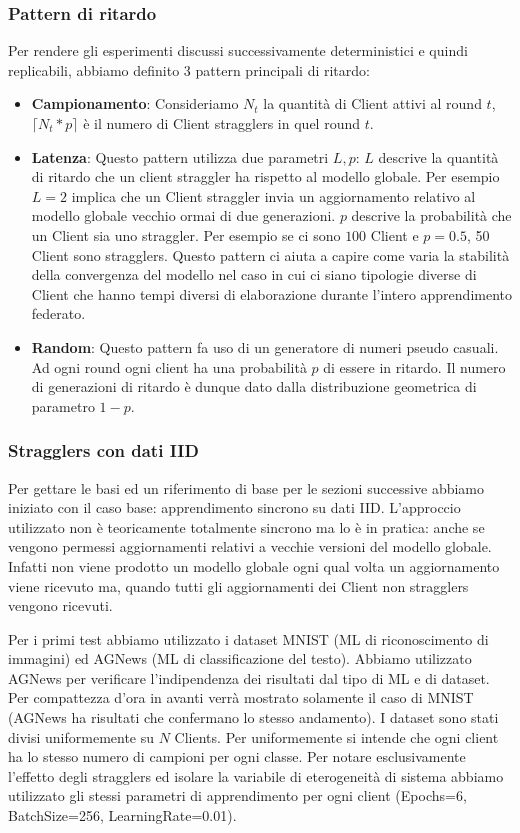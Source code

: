 \documentclass[a4paper, oneside, openright]{report}
\begin{document}
\subsubsection*{Pattern di ritardo}
Per rendere gli esperimenti discussi successivamente deterministici e quindi replicabili, abbiamo definito 3 pattern principali di ritardo:
\begin{itemize}
    \item \textbf{Campionamento}: 
        Consideriamo $N_{t}$ la quantità di Client attivi al round $t$, $\lceil N_t * p \rceil$ è il numero di Client stragglers in quel round $t$.
        
    \item \textbf{Latenza}: 
        Questo pattern utilizza due parametri $L, p$: $L$ descrive la quantità di ritardo che un client straggler ha rispetto al modello globale. Per esempio $L=2$ implica che un Client straggler invia un aggiornamento relativo al modello globale vecchio ormai di due generazioni. $p$ descrive la probabilità che un Client sia uno straggler. Per esempio se ci sono $100$ Client e $p = 0.5$, 50 Client sono stragglers. Questo pattern ci aiuta a capire come varia la stabilità della convergenza del modello nel caso in cui ci siano tipologie diverse di Client che hanno tempi diversi di elaborazione durante l'intero apprendimento federato.
  

    \item \textbf{Random}: 
        Questo pattern fa uso di un generatore di numeri pseudo casuali. Ad ogni round ogni client ha una probabilità $p$ di essere in ritardo. Il numero di generazioni di ritardo è dunque dato dalla distribuzione geometrica di parametro $1-p$.

\end{itemize}


\subsubsection*{Stragglers con dati IID}
Per gettare le basi ed un riferimento di base per le sezioni successive abbiamo iniziato con il caso base: apprendimento sincrono su dati IID.
L'approccio utilizzato non è teoricamente totalmente sincrono ma lo è in pratica: anche se vengono permessi aggiornamenti relativi a vecchie versioni del modello globale. Infatti non viene prodotto un modello globale ogni qual volta un aggiornamento viene ricevuto ma, quando tutti gli aggiornamenti dei Client non stragglers vengono ricevuti.

Per i primi test abbiamo utilizzato i dataset MNIST (ML di riconoscimento di immagini) ed AGNews (ML di classificazione del testo). Abbiamo utilizzato AGNews per verificare l'indipendenza dei risultati dal tipo di ML e di dataset. Per compattezza d'ora in avanti verrà mostrato solamente il caso di MNIST (AGNews ha risultati che confermano lo stesso andamento). I dataset sono stati divisi uniformemente su $N$ Clients. Per uniformemente si intende che ogni client ha lo stesso numero di campioni per ogni classe. Per notare esclusivamente l'effetto degli stragglers ed isolare la variabile di eterogeneità di sistema abbiamo utilizzato gli stessi parametri di apprendimento per ogni client (Epochs=6, BatchSize=256, LearningRate=0.01). 
\end{document}
